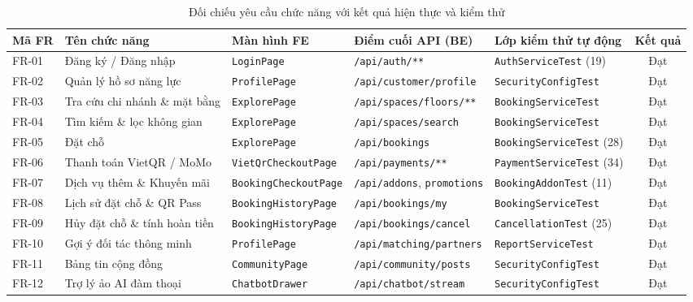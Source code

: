 \begin{table}[H]
\centering
\caption{Đối chiếu yêu cầu chức năng với kết quả hiện thực và kiểm thử}
\label{tab:gd_doichieu}
\scriptsize
\renewcommand{\arraystretch}{1.2}
\begin{tabular}{|p{1.0cm}|p{3.8cm}|p{2.6cm}|p{2.8cm}|p{2.6cm}|c|}
\hline
\textbf{Mã FR} & \textbf{Tên chức năng} & \textbf{Màn hình FE} & \textbf{Điểm cuối API (BE)} & \textbf{Lớp kiểm thử tự động} & \textbf{Kết quả} \\
\hline
FR-01 & Đăng ký / Đăng nhập & \texttt{LoginPage} & \texttt{/api/auth/**} & \texttt{AuthServiceTest} (19) & Đạt \\
\hline
FR-02 & Quản lý hồ sơ năng lực & \texttt{ProfilePage} & \texttt{/api/customer/profile} & \texttt{SecurityConfigTest} & Đạt \\
\hline
FR-03 & Tra cứu chi nhánh \& mặt bằng & \texttt{ExplorePage} & \texttt{/api/spaces/floors/**} & \texttt{BookingServiceTest} & Đạt \\
\hline
FR-04 & Tìm kiếm \& lọc không gian & \texttt{ExplorePage} & \texttt{/api/spaces/search} & \texttt{BookingServiceTest} & Đạt \\
\hline
FR-05 & Đặt chỗ & \texttt{ExplorePage} & \texttt{/api/bookings} & \texttt{BookingServiceTest} (28) & Đạt \\
\hline
FR-06 & Thanh toán VietQR / MoMo & \texttt{VietQrCheckoutPage} & \texttt{/api/payments/**} & \texttt{PaymentServiceTest} (34) & Đạt \\
\hline
FR-07 & Dịch vụ thêm \& Khuyến mãi & \texttt{BookingCheckoutPage} & \texttt{/api/addons}, \texttt{promotions} & \texttt{BookingAddonTest} (11) & Đạt \\
\hline
FR-08 & Lịch sử đặt chỗ \& QR Pass & \texttt{BookingHistoryPage} & \texttt{/api/bookings/my} & \texttt{BookingServiceTest} & Đạt \\
\hline
FR-09 & Hủy đặt chỗ \& tính hoàn tiền & \texttt{BookingHistoryPage} & \texttt{/api/bookings/cancel} & \texttt{CancellationTest} (25) & Đạt \\
\hline
FR-10 & Gợi ý đối tác thông minh & \texttt{ProfilePage} & \texttt{/api/matching/partners} & \texttt{ReportServiceTest} & Đạt \\
\hline
FR-11 & Bảng tin cộng đồng & \texttt{CommunityPage} & \texttt{/api/community/posts} & \texttt{SecurityConfigTest} & Đạt \\
\hline
FR-12 & Trợ lý ảo AI đàm thoại & \texttt{ChatbotDrawer} & \texttt{/api/chatbot/stream} & \texttt{SecurityConfigTest} & Đạt \\

\end{tabular}
\end{table}

